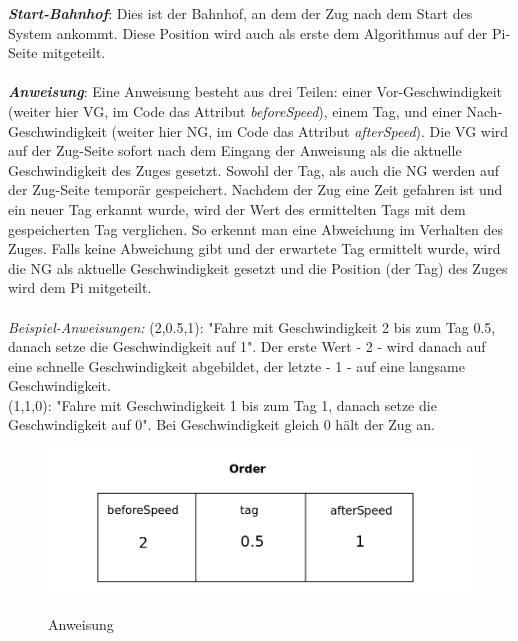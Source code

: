 \noindent
\textit{\textbf{Start-Bahnhof}}: Dies ist der Bahnhof, an dem der Zug nach dem Start des System ankommt. Diese Position wird auch als erste dem Algorithmus auf der Pi-Seite mitgeteilt.\\
\\
\textit{\textbf{Anweisung}}: Eine Anweisung besteht aus drei Teilen: einer Vor-Geschwindigkeit (weiter hier VG, im Code das Attribut \textit{beforeSpeed}), einem Tag, und einer Nach-Geschwindigkeit (weiter hier NG, im Code das Attribut \textit{afterSpeed}). Die VG wird auf der Zug-Seite sofort nach dem Eingang der Anweisung als die aktuelle Geschwindigkeit des Zuges gesetzt. Sowohl der Tag, als auch die NG werden auf der Zug-Seite temporär gespeichert. Nachdem der Zug eine Zeit gefahren ist und ein neuer Tag erkannt wurde, wird der Wert des ermittelten Tags mit dem gespeicherten Tag verglichen. So erkennt man eine Abweichung im Verhalten des Zuges. Falls keine Abweichung gibt und der erwartete Tag ermittelt wurde, wird die NG als aktuelle Geschwindigkeit gesetzt und die Position (der Tag) des Zuges wird dem Pi mitgeteilt.\\ 
\\
\textit{Beispiel-Anweisungen:} (2,0.5,1): "Fahre mit Geschwindigkeit 2 bis zum Tag 0.5, danach setze die Geschwindigkeit auf 1". Der erste Wert - 2 - wird danach auf eine schnelle Geschwindigkeit abgebildet, der letzte - 1 - auf eine langsame Geschwindigkeit.\\
(1,1,0): "Fahre mit Geschwindigkeit 1 bis zum Tag 1, danach setze die Geschwindigkeit auf 0". Bei Geschwindigkeit gleich 0 hält der Zug an.\\
\begin{figure}[H]	
\caption{Anweisung}
\includegraphics[width=2\textwidth, width=330pt]{content/images/order.png}
\label{pic:anweisung}
\end{figure}
\noindent
%
